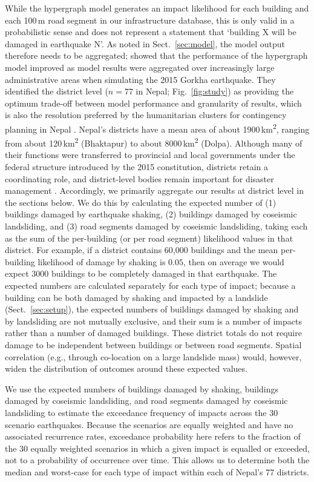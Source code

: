 \documentclass[nhess, manuscript]{copernicus}
\begin{document}
While the hypergraph model generates an impact likelihood for each building and each 100\,\unit{m} road segment in our infrastructure database, this is only valid in a probabilistic sense and does not represent a statement that `building X will be damaged in earthquake N'. As noted in Sect.~\ref{sec:model}, the model output therefore needs to be aggregated; \citet{Dunant2025} showed that the performance of the hypergraph model improved as model results were aggregated over increasingly large administrative areas when simulating the 2015 Gorkha earthquake. They identified the district level ($n = 77$ in Nepal; Fig.~\ref{fig:study}) as providing the optimum trade-off between model performance and granularity of results, which is also the resolution preferred by the humanitarian clusters for contingency planning in Nepal \citep{sijapati2025}. Nepal's districts have a mean area of about 1900\,\unit{km^2}, ranging from about 120\,\unit{km^2} (Bhaktapur) to about 8000\,\unit{km^2} (Dolpa). Although many of their functions were transferred to provincial and local governments under the federal structure introduced by the 2015 constitution, districts retain a coordinating role, and district-level bodies remain important for disaster management \citep{Bhandari2020}. Accordingly, we primarily aggregate our results at district level in the sections below. We do this by calculating the expected number of (1) buildings damaged by earthquake shaking, (2) buildings damaged by coseismic landsliding, and (3) road segments damaged by coseismic landsliding, taking each as the sum of the per-building (or per road segment) likelihood values in that district. For example, if a district contains 60,000 buildings and the mean per-building likelihood of damage by shaking is $0.05$, then on average we would expect 3000 buildings to be completely damaged in that earthquake. The expected numbers are calculated separately for each type of impact; because a building can be both damaged by shaking and impacted by a landslide (Sect.~\ref{sec:setup}), the expected numbers of buildings damaged by shaking and by landsliding are not mutually exclusive, and their sum is a number of impacts rather than a number of damaged buildings. These district totals do not require damage to be independent between buildings or between road segments. Spatial correlation (e.g., through co-location on a large landslide mass) would, however, widen the distribution of outcomes around these expected values.

We use the expected numbers of buildings damaged by shaking, buildings damaged by coseismic landsliding, and road segments damaged by coseismic landsliding to estimate the exceedance frequency of impacts across the 30 scenario earthquakes. Because the scenarios are equally weighted and have no associated recurrence rates, exceedance probability here refers to the fraction of the 30 equally weighted scenarios in which a given impact is equalled or exceeded, not to a probability of occurrence over time. This allows us to determine both the median and worst-case for each type of impact within each of Nepal's 77 districts.
\end{document}
